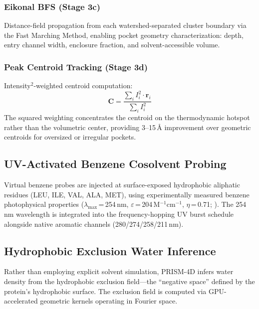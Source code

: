 \documentclass[11pt,twocolumn]{article}
\begin{document}
\subsubsection{Eikonal BFS (Stage 3c)}
Distance-field propagation from each watershed-separated cluster boundary via the Fast
Marching Method, enabling pocket geometry characterization: depth, entry channel width,
enclosure fraction, and solvent-accessible volume.

\subsubsection{Peak Centroid Tracking (Stage 3d)}
Intensity$^2$-weighted centroid computation:
\begin{equation}
  \mathbf{C} = \frac{\sum_i I_i^2 \cdot \mathbf{r}_i}{\sum_i I_i^2}
  \label{eq:centroid}
\end{equation}
The squared weighting concentrates the centroid on the thermodynamic hotspot rather than the
volumetric center, providing 3--15\,\AA{} improvement over geometric centroids for oversized
or irregular pockets.

\subsection{UV-Activated Benzene Cosolvent Probing}

Virtual benzene probes are injected at surface-exposed hydrophobic aliphatic residues (LEU,
ILE, VAL, ALA, MET), using experimentally measured benzene photophysical properties
($\lambda_{\max}$\,=\,254\,nm, $\varepsilon$\,=\,204\,M$^{-1}$cm$^{-1}$, $\eta$\,=\,0.71;
\citealt{pantos1978,cundall1972}). The 254\,nm wavelength is integrated into the
frequency-hopping UV burst schedule alongside native aromatic channels (280/274/258/211\,nm).

\subsection{Hydrophobic Exclusion Water Inference}
\label{sec:water}

Rather than employing explicit solvent simulation, PRISM-4D infers water density from the
hydrophobic exclusion field---the ``negative space'' defined by the protein's hydrophobic
surface. The exclusion field is computed via GPU-accelerated geometric kernels operating in
Fourier space.

\end{document}
